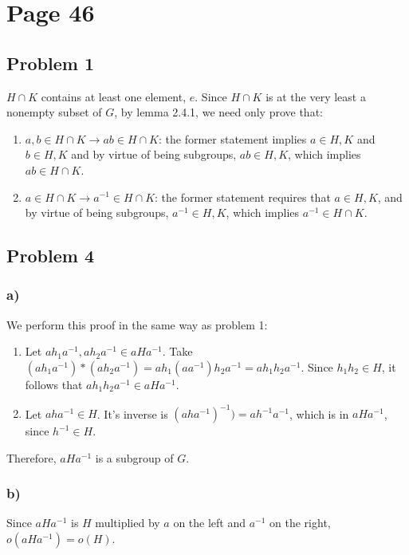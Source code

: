 \documentclass{article}
\begin{document}
\section*{Page 46}

    \subsection*{Problem 1}
        \(H \cap K\) contains at least one element, \(e\).
        Since \(H \cap K\) is at the very least a nonempty subset of \(G\), by lemma 2.4.1,
        we need only prove that:
        \begin{enumerate}
            \item \(a,b \in H \cap K \rightarrow ab \in H \cap K\): the former statement
                implies \(a \in H,K\) and \(b \in H,K\) and by virtue of being subgroups,
                \(ab \in H,K\), which implies \(ab \in H \cap K\).
            \item \(a \in H \cap K \rightarrow a^{-1} \in H \cap K\): the former
                statement requires that \(a \in H,K\), and by virtue of being subgroups,
                \(a^{-1} \in H,K\), which implies \(a^{-1} \in H \cap K\).
        \end{enumerate}

    \subsection*{Problem 4}
    \subsubsection*{a)}
        We perform this proof in the same way as problem 1:
        \begin{enumerate}
            \item Let \(ah_1a^{-1},ah_2a^{-1} \in aHa^{-1}\). Take
                \((ah_1a^{-1})*(ah_2a^{-1}) = ah_1(aa^{-1})h_2a^{-1} = ah_1h_2a^{-1}\).
                Since \(h_1h_2 \in H\), it follows that \(ah_1h_2a^{-1} \in aHa^{-1}\).
            \item Let \(aha^{-1} \in H\). It's inverse is \((aha^{-1})^{-1}) =
                ah^{-1}a^{-1}\), which is in \(aHa^{-1}\), since \(h^{-1} \in H\).
        \end{enumerate}
        Therefore, \(aHa^{-1}\) is a subgroup of \(G\).
    \subsubsection*{b)}
        Since \(aHa^{-1}\) is \(H\) multiplied by \(a\) on the left and \(a^{-1}\) on
        the right, \(o(aHa^{-1}) = o(H)\).
\end{document}
